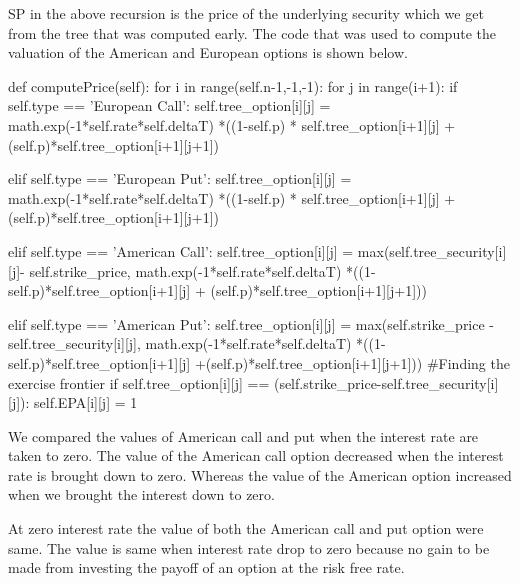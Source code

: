 \documentclass[12pt]{report}
\begin{document}
SP in the above recursion is the price of the underlying security which we get from the tree that was computed early. The code that was used to compute the valuation of the American and European options is shown below.
\begin{tiny}
	\begin{python}

	def computePrice(self):
	 for i in range(self.n-1,-1,-1):
	  for j in range(i+1):
		if self.type == 'European Call':
		 self.tree_option[i][j] = math.exp(-1*self.rate*self.deltaT)
								          *((1-self.p) * self.tree_option[i+1][j] 
								          + (self.p)*self.tree_option[i+1][j+1])
		
		elif self.type == 'European Put':
		 self.tree_option[i][j] = math.exp(-1*self.rate*self.deltaT)
		                      *((1-self.p) * self.tree_option[i+1][j] 
		                       + (self.p)*self.tree_option[i+1][j+1])
		
		elif self.type == 'American Call':
		 self.tree_option[i][j] = max(self.tree_security[i][j]-
		                          self.strike_price,
		                         math.exp(-1*self.rate*self.deltaT)
		                        *((1-self.p)*self.tree_option[i+1][j] 
		                     + (self.p)*self.tree_option[i+1][j+1]))
		
		elif self.type == 'American Put':
		 self.tree_option[i][j] = max(self.strike_price
		                       -self.tree_security[i][j],
		                       math.exp(-1*self.rate*self.deltaT)
		                       *((1-self.p)*self.tree_option[i+1][j]
		                       +(self.p)*self.tree_option[i+1][j+1]))
		 #Finding the exercise frontier
		 if self.tree_option[i][j] == (self.strike_price-self.tree_security[i][j]):
          self.EPA[i][j] = 1
\end{python}
\end{tiny}

We compared the values of American call and put when the interest rate are taken to zero. The value of the American call option decreased when the interest rate is brought down to zero. Whereas the value of the American option increased when we brought the interest down to zero. 

At zero interest rate the value of both the American call and put option were same. The value is same when interest rate drop to zero because no gain to be made from investing the payoff of an option at the risk free rate.
\end{document}
